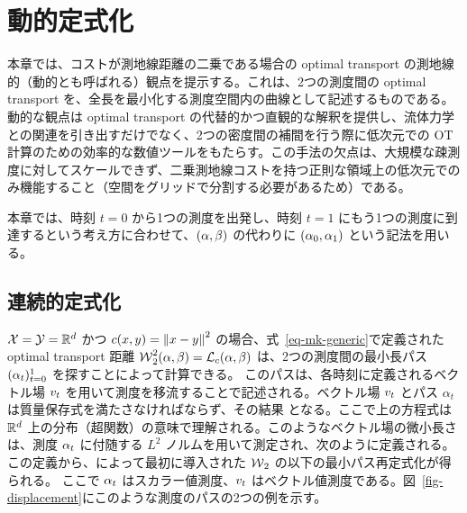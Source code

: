 \chapter{動的定式化}
\label{c-dynamic}

本章では、コストが測地線距離の二乗である場合の optimal transport の測地線的（動的とも呼ばれる）観点を提示する。これは、2つの測度間の optimal transport を、全長を最小化する測度空間内の曲線として記述するものである。動的な観点は optimal transport の代替的かつ直観的な解釈を提供し、流体力学との関連を引き出すだけでなく、2つの密度間の補間を行う際に低次元での OT 計算のための効率的な数値ツールをもたらす。この手法の欠点は、大規模な疎測度に対してスケールできず、二乗測地線コストを持つ正則な領域上の低次元でのみ機能すること（空間をグリッドで分割する必要があるため）である。

本章では、時刻 $t=0$ から1つの測度を出発し、時刻 $t=1$ にもう1つの測度に到達するという考え方に合わせて、$(\alpha,\beta)$ の代わりに $(\alpha_0,\alpha_1)$ という記法を用いる。

\section{連続的定式化}

$\mathcal{X}=\mathcal{Y}=\mathbb{R}^d$ かつ $c(x,y)=\left\| x-y \right\|^2$ の場合、式~\eqref{eq-mk-generic}で定義された optimal transport 距離 $\operatorname{\mathcal{W}}_2^2(\alpha,\beta) = \mathcal{L}_c(\alpha,\beta)$ は、2つの測度間の最小長パス $(\alpha_t)_{t=0}^1$ を探すことによって計算できる。
このパスは、各時刻に定義されるベクトル場 $v_t$ を用いて測度を移流することで記述される。ベクトル場 $v_t$ とパス $\alpha_t$ は質量保存式を満たさなければならず、その結果
となる。ここで上の方程式は $\mathbb{R}^d$ 上の分布（超関数）の意味で理解される。このようなベクトル場の微小長さは、測度 $\alpha_t$ に付随する $L^2$ ノルムを用いて測定され、次のように定義される。
この定義から、\citet{benamou2000computational}によって最初に導入された $\operatorname{\mathcal{W}}_2$ の以下の最小パス再定式化が得られる。
ここで $\alpha_t$ はスカラー値測度、$v_t$ はベクトル値測度である。図~\ref{fig-displacement}にこのような測度のパスの2つの例を示す。


